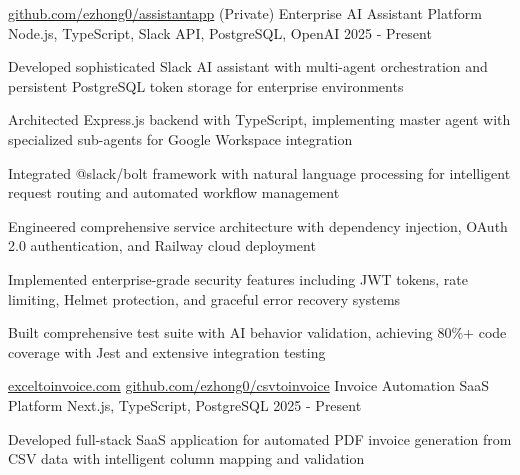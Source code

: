 \documentclass[12pt, letterpaper]{russell}
\begin{document}
\vspace{-0.2cm}
\begin{cventries}
\cvprojectinline
    {\href{https://github.com/ezhong0/assistantapp}{github.com/ezhong0/assistantapp} (Private)} %
    {Enterprise AI Assistant Platform} %
    {Node.js, TypeScript, Slack API, PostgreSQL, OpenAI} %
    {2025 - Present} %
    {
      \begin{cvitems}
        \item {Developed sophisticated Slack AI assistant with multi-agent orchestration and persistent PostgreSQL token storage for enterprise environments}
        \item {Architected Express.js backend with TypeScript, implementing master agent with specialized sub-agents for Google Workspace integration}
        \item {Integrated @slack/bolt framework with natural language processing for intelligent request routing and automated workflow management}
        \item {Engineered comprehensive service architecture with dependency injection, OAuth 2.0 authentication, and Railway cloud deployment}
        \item {Implemented enterprise-grade security features including JWT tokens, rate limiting, Helmet protection, and graceful error recovery systems}
        \item {Built comprehensive test suite with AI behavior validation, achieving 80\%+ code coverage with Jest and extensive integration testing}
      \end{cvitems}
    }
\cvprojectinline
    {\href{exceltoinvoice.com}{exceltoinvoice.com} \textbar{} \href{https://github.com/ezhong0/csvtoinvoice}{github.com/ezhong0/csvtoinvoice}} %
    {Invoice Automation SaaS Platform} %
    {Next.js, TypeScript, PostgreSQL} %
    {2025 - Present} %
    {
      \begin{cvitems}
        \item {Developed full-stack SaaS application for automated PDF invoice generation from CSV data with intelligent column mapping and validation}

\end{cvitems}}
\end{cventries}
\end{document}

